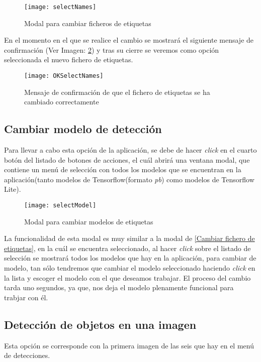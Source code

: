 \begin{figure}[!h]
    \centering
    \texttt{[image: selectNames]}
    \caption{Modal para cambiar ficheros de etiquetas}\label{fig:selectNames}
\end{figure}

En el momento en el que se realice el cambio se mostrará el siguiente mensaje de confirmación (Ver Imagen: \ref{fig:OKSelectNames}) y tras su cierre se veremos como opción seleccionada el nuevo fichero de etiquetas.

\begin{figure}[!h]
    \centering
    \texttt{[image: OKSelectNames]}
    \caption{Mensaje de confirmación de que el fichero de etiquetas se ha cambiado correctamente}\label{fig:OKSelectNames}
\end{figure}

\subsection{Cambiar modelo de detección}
Para llevar a cabo esta opción de la aplicación, se debe de hacer \textit{click} en el cuarto botón del listado de botones de acciones, el cuál abrirá una ventana modal, que contiene un menú de selección con todos los modelos que se encuentran en la aplicación(tanto modelos de Tensorflow(formato \textit{pb}) como modelos de Tensorflow Lite).

\begin{figure}[!h]
    \centering
    \texttt{[image: selectModel]}
    \caption{Modal para cambiar modelos de etiquetas}\label{fig:selectModel}
\end{figure}

La funcionalidad de esta modal es muy similar a la modal de \ref{Cambiar fichero de etiquetas}, en la cuál se encuentra seleccionado, al hacer \textit{click} sobre el listado de selección se mostrará todos los modelos que hay en la aplicación, para cambiar de modelo, tan sólo tendremos que cambiar el modelo seleccionado haciendo \textit{click} en la lista y escoger el modelo con el que deseamos trabajar.
El proceso del cambio tarda uno segundos, ya que, nos deja el modelo plenamente funcional para trabjar con él.

\subsection{Detección de objetos en una imagen} \label{od_img}
Esta opción se corresponde con la primera imagen de las seis que hay en el menú de detecciones.

